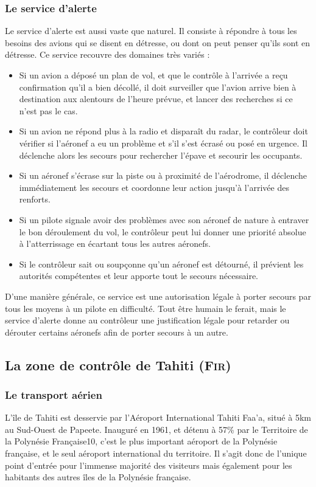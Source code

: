        \subsubsection{Le service d'alerte}
Le service d'alerte est aussi vaste que naturel. Il consiste à répondre à tous les besoins des avions qui se disent en détresse, ou dont on peut penser qu'ils sont en détresse. Ce service recouvre des domaines très variés :
\begin{itemize}
\item Si un avion a déposé un plan de vol, et que le contrôle à l'arrivée a reçu confirmation qu'il a bien décollé, il doit surveiller que l'avion arrive bien à destination aux alentours de l'heure prévue, et lancer des recherches si ce n'est pas le cas.
\item Si un avion ne répond plus à la radio et disparaît du radar, le contrôleur doit vérifier si l'aéronef a eu un problème et s'il s'est écrasé ou posé en urgence. Il déclenche alors les secours pour rechercher l'épave et secourir les occupants.
\item Si un aéronef s'écrase sur la piste ou à proximité de l'aérodrome, il déclenche immédiatement les secours et coordonne leur action jusqu'à l'arrivée des renforts.
\item Si un pilote signale avoir des problèmes avec son aéronef de nature à entraver le bon déroulement du vol, le contrôleur peut lui donner une priorité absolue à l'atterrissage en écartant tous les autres aéronefs.
\item Si le contrôleur sait ou soupçonne qu'un aéronef est détourné, il prévient les autorités compétentes et leur apporte tout le secours nécessaire.
\end{itemize}\medskip

D'une manière générale, ce service est une autorisation légale à porter secours par tous les moyens à un pilote en difficulté. Tout être humain le ferait, mais le service d'alerte donne au contrôleur une justification légale pour retarder ou dérouter certains aéronefs afin de porter secours à un autre.

    \subsection{La zone de contrôle de Tahiti (\textsc{Fir})}
        \subsubsection{Le transport aérien}
L’île de Tahiti est desservie par l'Aéroport International Tahiti Faa'a, situé à 5km au Sud-Ouest de Papeete. Inauguré en 1961, et détenu à 57\% par le Territoire de la Polynésie Française10, c’est le plus important aéroport de la Polynésie française, et le seul aéroport international du territoire. Il s’agit donc de l’unique point d’entrée pour l’immense majorité des visiteurs mais également pour les habitants des autres îles de la Polynésie française.

